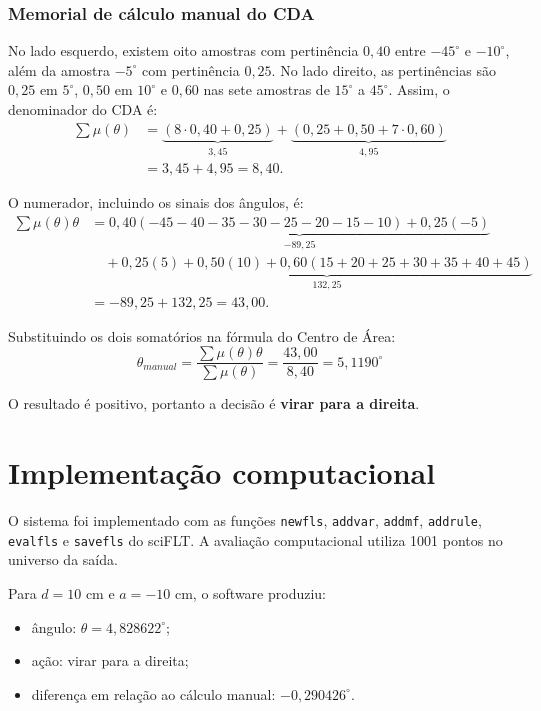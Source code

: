 \documentclass[12pt,a4paper]{article}
\begin{document}
\subsubsection*{Memorial de cálculo manual do CDA}

No lado esquerdo, existem oito amostras com pertinência $0{,}40$ entre
$-45^\circ$ e $-10^\circ$, além da amostra $-5^\circ$ com pertinência
$0{,}25$. No lado direito, as pertinências são $0{,}25$ em $5^\circ$,
$0{,}50$ em $10^\circ$ e $0{,}60$ nas sete amostras de $15^\circ$ a
$45^\circ$. Assim, o denominador do CDA é:
\begin{align*}
\sum \mu(\theta)
&=\underbrace{(8\cdot0{,}40+0{,}25)}_{3{,}45}
 +\underbrace{(0{,}25+0{,}50+7\cdot0{,}60)}_{4{,}95}\\
&=3{,}45+4{,}95=8{,}40.
\end{align*}

O numerador, incluindo os sinais dos ângulos, é:
\begin{align*}
\sum \mu(\theta)\theta
&=\underbrace{0{,}40(-45-40-35-30-25-20-15-10)
 +0{,}25(-5)}_{-89{,}25}\\
&\quad+\underbrace{0{,}25(5)+0{,}50(10)
 +0{,}60(15+20+25+30+35+40+45)}_{132{,}25}\\
&=-89{,}25+132{,}25=43{,}00.
\end{align*}

Substituindo os dois somatórios na fórmula do Centro de Área:
\[
\boxed{\theta_{manual}
=\frac{\sum \mu(\theta)\theta}{\sum \mu(\theta)}
=\frac{43{,}00}{8{,}40}
=5{,}1190^\circ}
\]

O resultado é positivo, portanto a decisão é \textbf{virar para a direita}.

\section{Implementação computacional}

O sistema foi implementado com as funções \texttt{newfls}, \texttt{addvar}, \texttt{addmf}, \texttt{addrule}, \texttt{evalfls} e \texttt{savefls} do sciFLT. A avaliação computacional utiliza 1001 pontos no universo da saída.

Para $d=10$ cm e $a=-10$ cm, o software produziu:

\begin{itemize}
  \item ângulo: $\theta=4{,}828622^\circ$;
  \item ação: virar para a direita;
  \item diferença em relação ao cálculo manual: $-0{,}290426^\circ$.
\end{itemize}
\end{document}
